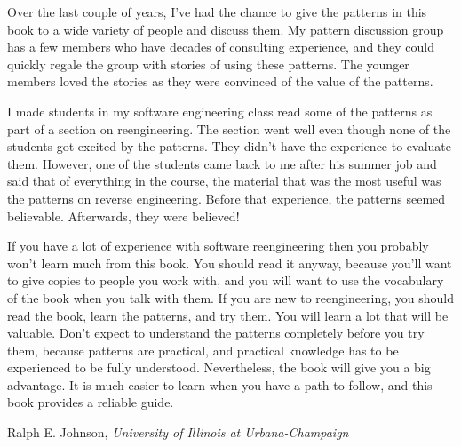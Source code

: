 \documentclass[a4paper,10pt,twoside]{book}
\begin{document}
Over the last couple of years, I've had the chance to give the patterns in this book to a wide variety of people and discuss them.  My pattern discussion group has a few members who have decades of consulting experience, and they could quickly regale the group with stories of using these patterns.  The younger members loved the stories as they were convinced of the value of the patterns.

I made students in my software engineering class read some of the patterns as part of a section on reengineering.  The section went well even though none of the students got excited by the patterns.  They didn't have the experience to evaluate them. However, one of the students came back to me after his summer job and said that of everything in the course, the material that was the most useful was the patterns on reverse engineering.  Before that experience, the patterns seemed believable.  Afterwards, they were believed!

If you have a lot of experience with software reengineering then you probably won't learn much from this book.  You should read it anyway, because you'll want to give copies to people you work with, and you will want to use the vocabulary of the book when you talk with them.  If you are new to reengineering, you should read the book, learn the patterns, and try them.  You will learn a lot that will be valuable.  Don't expect to understand the patterns completely before you try them, because patterns are practical, and practical knowledge has to be experienced to be fully understood.  Nevertheless, the book will give you a big advantage.  It is much easier to learn when you have a path to follow, and this book provides a reliable guide.

\hfill Ralph E. Johnson, \emph{University of Illinois at Urbana-Champaign}

\vfill

\ifx\wholebook\relax\else
   
   
   
\end{document}
